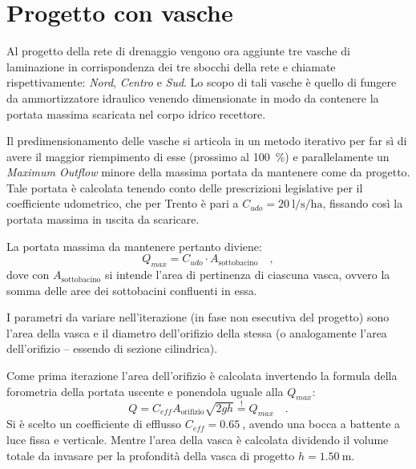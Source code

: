 \clearpage
\section{Progetto con vasche}
Al progetto della rete di drenaggio vengono ora aggiunte tre vasche di laminazione in corrispondenza dei tre sbocchi della rete e chiamate rispettivamente: \emph{Nord}, \emph{Centro} e \emph{Sud}.
Lo scopo di tali vasche è quello di fungere da ammortizzatore idraulico venendo dimensionate in modo da contenere la portata massima scaricata nel corpo idrico recettore.

Il predimensionamento delle vasche si articola in un metodo iterativo per far sì di avere il maggior riempimento di esse (prossimo al \SI{100}{\percent}) e parallelamente un \emph{Maximum Outflow} minore della massima portata da mantenere come da progetto. 
Tale portata è calcolata tenendo conto delle prescrizioni legislative per il coefficiente udometrico, che per Trento è pari a $C_{udo} = \SI{20}{\litre\per\second\per\hectare}$, fissando così la portata massima in uscita da scaricare. 

La portata massima da mantenere pertanto diviene:
\begin{equation}
    \label{eq:qmax}
    Q_{max} = C_{udo} \cdot A_{\text{sottobacino}} \quad ,
\end{equation}
dove con $A_{\text{sottobacino}}$ si intende l'area di pertinenza di ciascuna vasca, ovvero la somma delle aree dei sottobacini confluenti in essa.

I parametri da variare nell'iterazione (in fase non esecutiva del progetto) sono l'area della vasca e il diametro dell'orifizio della stessa (o analogamente l'area dell'orifizio -- essendo di sezione cilindrica). 


Come prima iterazione l'area dell'orifizio è calcolata invertendo la formula della forometria della portata uscente e ponendola uguale alla $Q_{max}$:
\begin{equation}
    Q  = C_{eff} A_{\text{orifizio}} \sqrt{2 g h} \overset{!}{=} Q_{max} \quad .
\end{equation}
Si è scelto un coefficiente di efflusso $C_{eff} = \SI{0.65}{}$, avendo una bocca a battente a luce fissa e verticale. 
Mentre l'area della vasca è calcolata dividendo il volume totale da invasare per la profondità della vasca di progetto $h = \SI{1.50}{\metre}$.

